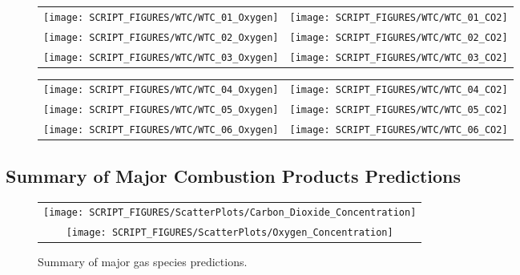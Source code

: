\begin{figure}[h!]
\begin{tabular*}{\textwidth}{l@{\extracolsep{\fill}}r}
\texttt{[image: SCRIPT\_FIGURES/WTC/WTC\_01\_Oxygen]} &
\texttt{[image: SCRIPT\_FIGURES/WTC/WTC\_01\_CO2]} \\
\texttt{[image: SCRIPT\_FIGURES/WTC/WTC\_02\_Oxygen]} &
\texttt{[image: SCRIPT\_FIGURES/WTC/WTC\_02\_CO2]} \\
\texttt{[image: SCRIPT\_FIGURES/WTC/WTC\_03\_Oxygen]} &
\texttt{[image: SCRIPT\_FIGURES/WTC/WTC\_03\_CO2]}
\end{tabular*}
\label{NIST_WTC_Oxygen_CO2_1}
\end{figure}

\newpage

\begin{figure}[p]
\begin{tabular*}{\textwidth}{l@{\extracolsep{\fill}}r}
\texttt{[image: SCRIPT\_FIGURES/WTC/WTC\_04\_Oxygen]} &
\texttt{[image: SCRIPT\_FIGURES/WTC/WTC\_04\_CO2]} \\
\texttt{[image: SCRIPT\_FIGURES/WTC/WTC\_05\_Oxygen]} &
\texttt{[image: SCRIPT\_FIGURES/WTC/WTC\_05\_CO2]} \\
\texttt{[image: SCRIPT\_FIGURES/WTC/WTC\_06\_Oxygen]} &
\texttt{[image: SCRIPT\_FIGURES/WTC/WTC\_06\_CO2]}
\end{tabular*}
\label{NIST_WTC_Oxygen_CO2_2}
\end{figure}


\clearpage

\subsection{Summary of Major Combustion Products Predictions}


\begin{figure}[h!]
\begin{center}
\begin{tabular}{c}
\texttt{[image: SCRIPT\_FIGURES/ScatterPlots/Carbon\_Dioxide\_Concentration]} \\
\texttt{[image: SCRIPT\_FIGURES/ScatterPlots/Oxygen\_Concentration]}\\
\end{tabular}
\end{center}
\caption[Summary of major gas species predictions]
{Summary of major gas species predictions.}
\end{figure}


